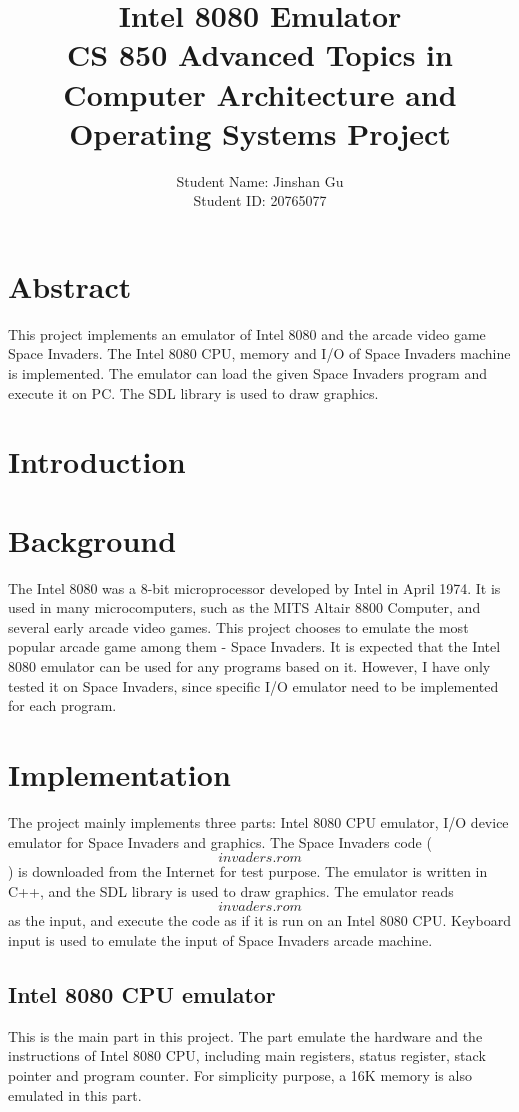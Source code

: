 \documentclass[a4paper,11pt]{article}
\title{\vspace{6cm}\textbf{Intel 8080 Emulator} \\ CS 850 Advanced Topics in Computer Architecture and Operating Systems Project\\}
\author{Student Name: Jinshan Gu\\ Student ID: 20765077 \\}
\date{}
\theoremstyle{plain} %
\begin{document}
\maketitle 
\newpage

\section*{Abstract}

This project implements an emulator of Intel 8080 and the arcade video game Space Invaders. The Intel 8080 CPU, memory and I/O of Space Invaders machine is implemented. The emulator can load the given Space Invaders program and execute it on PC. The SDL library is used to draw graphics.

\newpage

\tableofcontents
\newpage


\section{Introduction}

\section{Background}
The Intel 8080 was a 8-bit microprocessor developed by Intel in April 1974. It is used in many microcomputers, such as the MITS Altair 8800 Computer, and several early arcade video games. This project chooses to emulate the most popular arcade game among them - Space Invaders. It is expected that the Intel 8080 emulator can be used for any programs based on it. However, I have only tested it on Space Invaders, since specific I/O emulator need to be implemented for each program. 

\section{Implementation}
The project mainly implements three parts: Intel 8080 CPU emulator, I/O device emulator for Space Invaders and graphics. The Space Invaders code ($$invaders.rom$$) is downloaded from the Internet for test purpose. The emulator is written in C++, and the SDL library is used to draw graphics. The emulator reads $$invaders.rom$$ as the input, and execute the code as if it is run on an Intel 8080 CPU. Keyboard input is used to emulate the input of Space Invaders arcade machine.

\subsection{Intel 8080 CPU emulator}
This is the main part in this project. The part emulate the hardware and the instructions of Intel 8080 CPU, including main registers, status register, stack pointer and program counter. For simplicity purpose, a 16K memory is also emulated in this part. 
\end{document}
